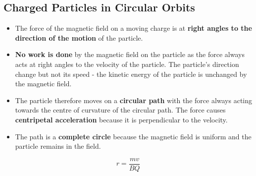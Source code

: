 \subsection{Charged Particles in Circular Orbits}

\begin{itemize}
    \item The force of the magnetic field on a moving charge is at \textbf{right angles to the direction of the motion} of the particle.
    \item \textbf{No work is done} by the magnetic field on the particle as the force always acts at right angles to the velocity of the particle. The particle's direction change but not its speed - the kinetic energy of the particle is unchanged by the magnetic field.
    \item The particle therefore moves on a \textbf{circular path} with the force always acting towards the centre of curvature of the circular path. The force causes \textbf{centripetal acceleration} because it is perpendicular to the velocity.
    \item The path is a \textbf{complete circle} because the magnetic field is uniform and the particle remains in the field.
\end{itemize}
$$r=\frac{mv}{BQ}$$
